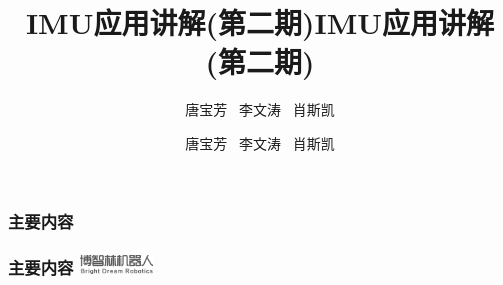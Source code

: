 \documentclass[10pt,aspectratio=43,mathserif]{beamer}
\title{IMU应用讲解(第二期)}
\author{唐宝芳 \ 李文涛 \ 肖斯凯}
\date{\zhtoday}
\begin{document}
\setlength{\abovedisplayskip}{1ex}%
\setlength{\belowdisplayskip}{1ex}%

\begin{frame}
	\title{IMU应用讲解(第二期)}
	\author{唐宝芳 \ 李文涛 \ 肖斯凯} %
\titlepage
\end{frame}

\begin{frame}
	\frametitle{主要内容}
  \frametitle{主要内容 \hfill \includegraphics[height=0.5cm]{00_logo.png}}
	
	\tableofcontents[hideallsubsections]
  \addtocounter{framenumber}{-1}  %
\end{frame}

		
	












% 
% 
% 
\end{document}
